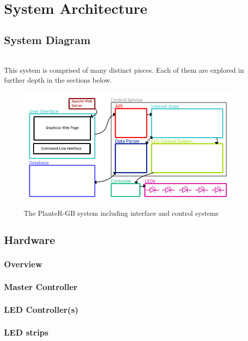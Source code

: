 \documentclass[onecolumn, draftclsnofoot,10pt, compsoc]{IEEEtran}
\begin{document}
	\section{System Architecture}
		\subsection{System Diagram}

		\noindent \\This system is comprised of many distinct pieces. Each of them are explored in further depth in the sections below.

		\begin{center}
			\begin{figure}[H]
				\includegraphics[width=\linewidth]{systemDiagrams/systemdiag.png}
				\caption{The PlanteR-GB system including interface and control systems}
				\label{fig:systemDiagram}
			\end{figure}
		\end{center}

		\subsection{Hardware}
			\subsubsection{Overview}
			\subsubsection{Master Controller}
			\subsubsection{LED Controller(s)}
			\subsubsection{LED strips}
\end{document}

